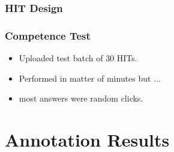 \documentclass[10pt]{beamer}
\newenvironment{itemwide}%
{\begin{itemize}%
    \setlength{\itemsep}{5pt}%
    \setlength{\parskip}{5pt}}%
  {\end{itemize}}
\begin{document}
\begin{frame}
  \frametitle{HIT Design}
  \begin{center}
  \end{center}
\end{frame}

\begin{frame}
  \frametitle{Competence Test}
\begin{itemwide}
 \item Uploaded test batch of 30 HITs.
 \item Performed in matter of minutes but $\ldots$
 \item most answers were random clicks.
\end{itemwide}
\end{frame}

\section{Annotation Results}
\end{document}
